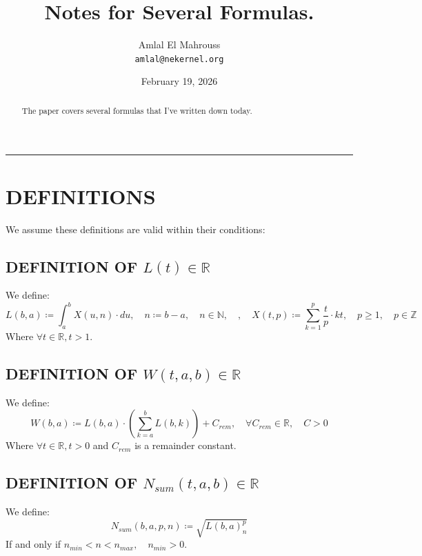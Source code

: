 \documentclass[11pt, a4paper]{article}
\title{Notes for Several Formulas.}
\author{Amlal El Mahrouss\\\texttt{amlal@nekernel.org}}
\date{February 19, 2026}
\begin{document}
\maketitle

\begin{center}
	\rule[0.01cm]{17cm}{0.01cm}
\end{center}

\begin{abstract}
\begin{center}
    The paper covers several formulas that I've written down today.
\end{center}
\end{abstract}

\section{DEFINITIONS}

We assume these definitions are valid within their conditions:

\subsection{DEFINITION OF $L(t) \in \mathbb{R}$}
We define:
\begin{equation}
    L(b, a) \coloneqq \int_{a}^{b}X(u, n)\cdot du, \quad n \coloneqq b - a, \quad n \in \mathbb{N}, \quad, \quad X(t, p) \coloneqq \sum_{k=1}^{p}\frac{t}{p}\cdot kt, \quad p \geq 1, \quad p \in \mathbb{Z}
\end{equation}
Where $\forall t \in \mathbb{R}, t > 1$.

\subsection{DEFINITION OF $W(t, a, b) \in \mathbb{R}$}
We define:
\begin{equation}
    W(b, a) \coloneqq L(b, a)\cdot(\sum_{k=a}^{b} L(b, k)) +C_{rem}, \quad \forall C_{rem} \in \mathbb{R}, \quad C > 0
\end{equation}
Where $\forall t \in \mathbb{R}, t > 0$ and $C_{rem}$ is a remainder constant.

\subsection{DEFINITION OF $N_{sum}(t, a, b) \in \mathbb{R}$}

We define:
\begin{equation}
    N_{sum}(b, a, p, n) \coloneqq \sqrt{L(b, a)^p_{n}}
\end{equation}
If and only if $n_{min} < n < n_{max}, \quad n_{min} > 0$.
\end{document}

